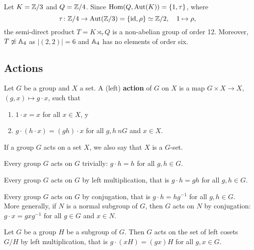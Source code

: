 \begin{example}
Let $K=\mathbb{Z}/3$ and $Q=\mathbb{Z}/4$. Since $\operatorname{Hom}(Q,\operatorname{Aut}(K))=\{1,\tau\}$, where 
\[
\tau\colon\mathbb{Z}/4\to\operatorname{Aut}(\mathbb{Z}/3)=\{\operatorname{id},\rho\}\simeq\mathbb{Z}/2,\quad 1\mapsto\rho,
\]
the semi-direct product $T=K\rtimes_\tau Q$ is a non-abelian group of order 12. Moreover,
$T\not\simeq\mathbb{A}
_4$ as $|(2,2)|=6$ and $\mathbb{A}_4$ has no elements of order six.
\end{example}



\subsection{Actions}

\begin{definition}
    Let $G$ be a group and $X$ a set. 
    A (left) \textbf{action} of $G$ on $X$ is a map 
    $G\times X\to X$, $(g,x)\mapsto g\cdot x$, such that 
    \begin{enumerate}
        \item $1\cdot x=x$ for all $x\in X$, y
        \item $g\cdot (h\cdot x)=(gh)\cdot x$ for all $g,h\ n G$ and $x\in X$.
    \end{enumerate}
\end{definition}

If a group $G$ acts on a set $X$, we also say that
$X$ is a $G$-set.

\begin{example}
Every group $G$ acts on $G$ trivially: $g\cdot h=h$ for all $g,h\in G$.
\end{example}

\begin{example}
Every group $G$ acts on $G$ by left multiplication, that is
$g\cdot h=gh$ for all $g,h\in G$.
\end{example}

\begin{example}
Every group $G$ acts on $G$ by conjugation, that is
$g\cdot h=hg^{-1}$ for all $g,h\in G$. More generally, 
if $N$ is a normal subgroup of $G$, then $G$ acts on
$N$ by conjugation: $g\cdot x=gx
g^{-1}$ for all $g\in G$ and $x\in N$. 
\end{example}

\begin{example}
Let $G$ be a group $H$ be a subgroup of $G$. Then $G$ 
acts on the set of left cosets $G/H$ by left multiplication, that 
is $g\cdot (xH)=(gx)H$ for all $g,x\in G$.
\end{example}

